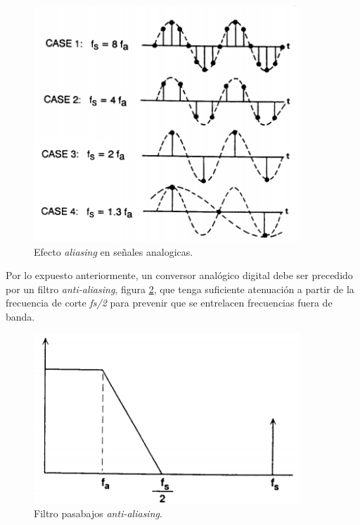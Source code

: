 \begin{figure}[ht]
	\centering
	\includegraphics[width=100mm]{./Figures/muestreo2.png}
	\caption{Efecto \textit{aliasing} en señales analogicas.}
	\label{fig:muestreo2}
\end{figure}

Por lo expuesto anteriormente, un conversor analógico digital debe ser precedido por un filtro \textit{anti-aliasing}, figura \ref{fig:muestreo3}, que tenga suficiente atenuación a partir de la frecuencia de corte \textit{fs/2} para prevenir que se entrelacen frecuencias fuera de banda.

\begin{figure}[ht]
	\centering
	\includegraphics[width=100mm]{./Figures/muestreo3.png}
	\caption{Filtro pasabajos \textit{anti-aliasing}.}
	\label{fig:muestreo3}
\end{figure}

